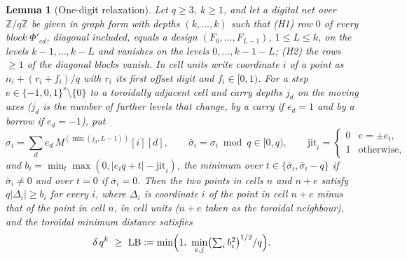 \documentclass[11pt]{amsart}
\newtheorem{lemma}[theorem]{Lemma}
\theoremstyle{definition}
\theoremstyle{plain}
\newcommand{\Z}{\mathbb{Z}}
\begin{document}
\begin{lemma}[One-digit relaxation]\label{lem:Ss}
Let $q\ge3$, $k\ge1$, and let a digital net over $\Z/q\Z$ be given in graph form with depths $(k,\dots,k)$ such that (H1) row $0$ of every block $\Phi'_{cd}$, diagonal included, equals a design $(F_0,\dots,F_{L-1})$, $1\le L\le k$, on the levels $k-1,\dots,k-L$ and vanishes on the levels $0,\dots,k-1-L$; (H2) the rows $\ge1$ of the diagonal blocks vanish. In cell units write coordinate $i$ of a point as $n_i+(r_i+f_i)/q$ with $r_i$ its first offset digit and $f_i\in[0,1)$. For a step $e\in\{-1,0,1\}^s\setminus\{0\}$ to a toroidally adjacent cell and carry depths $j_d$ on the moving axes ($j_d$ is the number of further levels that change, by a carry if $e_d=1$ and by a borrow if $e_d=-1$), put
\[
\sigma_i=\sum_de_d\,M^{(\min(j_d,L-1))}[i][d],\qquad \bar\sigma_i=\sigma_i\bmod q\in[0,q),\qquad \mathrm{jit}_i=\begin{cases}0&e=\pm e_i,\\1&\text{otherwise,}\end{cases}
\]
and $b_i=\min_t\max(0,|e_iq+t|-\mathrm{jit}_i)$, the minimum over $t\in\{\bar\sigma_i,\bar\sigma_i-q\}$ if $\bar\sigma_i\ne0$ and over $t=0$ if $\bar\sigma_i=0$. Then the two points in cells $n$ and $n+e$ satisfy $q|\Delta_i|\ge b_i$ for every $i$, where $\Delta_i$ is coordinate $i$ of the point in cell $n+e$ minus that of the point in cell $n$, in cell units ($n+e$ taken as the toroidal neighbour), and the toroidal minimum distance satisfies
\[
\delta\,q^k\ \ge\ \mathrm{LB}:=\min\Bigl(1,\ \min_{e,j}\bigl(\textstyle\sum_ib_i^2\bigr)^{1/2}/q\Bigr).
\]
\end{lemma}
\end{document}

